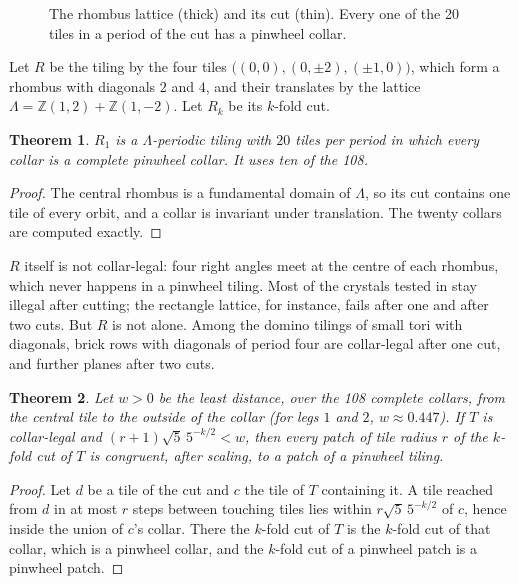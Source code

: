 \documentclass[11pt]{article}
\newtheorem{theorem}{Theorem}
\theoremstyle{definition}
\theoremstyle{remark}
\begin{document}
\begin{figure}[t]
\centering

\caption{The rhombus lattice (thick) and its cut (thin). Every one of the 20
tiles in a period of the cut has a pinwheel collar.}
\label{fig:rhombus}
\end{figure}

Let $R$ be the tiling by the four tiles $\big((0,0),(0,\pm2),(\pm1,0)\big)$,
which form a rhombus with diagonals $2$ and $4$, and their translates by the
lattice $\Lambda=\mathbb{Z}(1,2)+\mathbb{Z}(1,-2)$. Let $R_k$ be its $k$-fold
cut.

\begin{theorem}\label{thm:witness}
$R_1$ is a $\Lambda$-periodic tiling with $20$ tiles per period in which every
collar is a complete pinwheel collar. It uses ten of the 108.
\end{theorem}

\begin{proof}
The central rhombus is a fundamental domain of $\Lambda$, so its cut contains
one tile of every orbit, and a collar is invariant under translation. The
twenty collars are computed exactly.
\end{proof}

$R$ itself is not collar-legal: four right angles meet at the centre of each
rhombus, which never happens in a pinwheel tiling. Most of the crystals tested
in \cite{CP-atlas} stay illegal after cutting; the rectangle lattice, for
instance, fails after one and after two cuts. But $R$ is not alone. Among the
domino tilings of small tori with diagonals, brick rows with diagonals of period
four are collar-legal after one cut, and further planes after two cuts.

\begin{theorem}\label{thm:radius}
Let $w>0$ be the least distance, over the 108 complete collars, from the
central tile to the outside of the collar (for legs $1$ and $2$,
$w\approx 0.447$). If $T$ is collar-legal and $(r+1)\sqrt5\,5^{-k/2}<w$, then
every patch of tile radius $r$ of the $k$-fold cut of $T$ is congruent, after
scaling, to a patch of a pinwheel tiling.
\end{theorem}

\begin{proof}
Let $d$ be a tile of the cut and $c$ the tile of $T$ containing it. A tile
reached from $d$ in at most $r$ steps between touching tiles lies within
$r\sqrt5\,5^{-k/2}$ of $c$, hence inside the union of $c$'s collar. There the
$k$-fold cut of $T$ is the $k$-fold cut of that collar, which is a pinwheel
collar, and the $k$-fold cut of a pinwheel patch is a pinwheel patch.
\end{proof}
\end{document}

